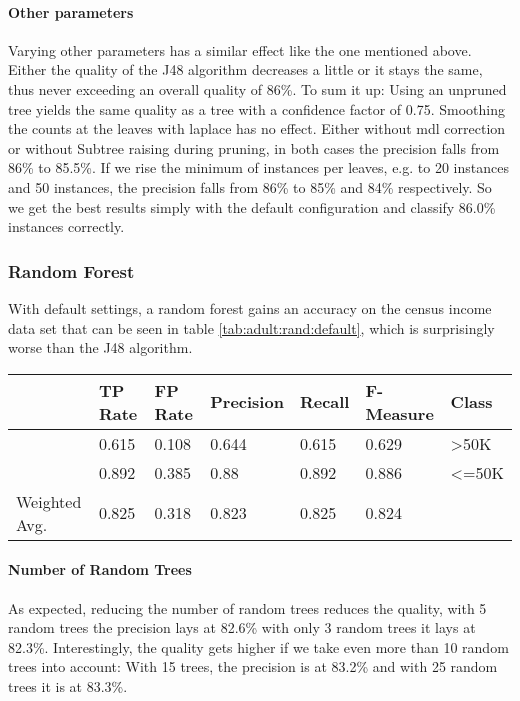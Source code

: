 \documentclass[paper=a4, fontsize=11pt]{scrartcl} %
\numberwithin{equation}{section} %
\numberwithin{figure}{section} %
\numberwithin{table}{section} %
\begin{document}
\paragraph{Other parameters}
Varying other parameters has a similar effect like the one mentioned above. Either the quality of the J48 algorithm decreases a little or it stays the same, thus never exceeding an overall quality of 86\%. To sum it up: Using an unpruned tree yields the same quality as a tree with a confidence factor of 0.75. Smoothing the counts at the leaves with laplace has no effect. Either without mdl correction or without Subtree raising during pruning, in both cases the precision falls from 86\% to
85.5\%. If we rise the minimum of instances per leaves, e.g. to 20 instances and 50 instances, the precision falls from 86\% to 85\% and 84\% respectively. So we get the best results simply with the default configuration and classify 86.0\% instances correctly.



\subsubsection{Random Forest}

With default settings, a random forest gains an accuracy on the census income data set that can be seen in table \ref{tab:adult:rand:default}, which is surprisingly worse than the J48 algorithm.
\begin{table*}[htb]\centering
  \begin{tabular*}{\columnwidth}{@{}lllllll@{}}
      \toprule 
              &  TP Rate & FP Rate & Precision & Recall & F-Measure & Class    \\  \midrule
              &  0.615   & 0.108   & 0.644     & 0.615  & 0.629     & >50K     \\     
              &  0.892   & 0.385   & 0.88      & 0.892  & 0.886     & <=50K    \\ 
Weighted Avg. &  0.825   & 0.318   & 0.823     & 0.825  & 0.824     &          \\ \bottomrule
    \end{tabular*}
\caption{Random Forest -- Default Settings} 
\label{tab:adult:rand:default}
\end{table*}
\FloatBarrier


\paragraph{Number of Random Trees}
As expected, reducing the number of random trees reduces the quality, with 5 random trees the precision lays at 82.6\% with only 3 random trees it lays at 82.3\%. Interestingly, the quality gets higher if we take even more than 10 random trees into account: With 15 trees, the precision is at 83.2\% and with 25 random trees it is at 83.3\%.
\end{document}
